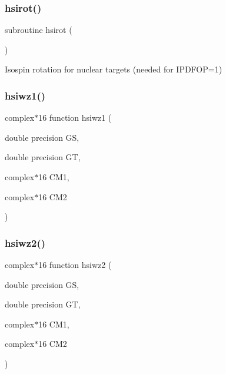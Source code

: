 \subsubsection{\texorpdfstring{hsirot()}{hsirot()}}
{\footnotesize\ttfamily subroutine hsirot (\begin{DoxyParamCaption}{ }\end{DoxyParamCaption})}



Isospin rotation for nuclear targets (needed for I\+P\+D\+F\+OP=1) 

\mbox{\label{djangoh__h_8f_a57c2acc216ca2579ebdaffd3f7250e69}} 
\subsubsection{\texorpdfstring{hsiwz1()}{hsiwz1()}}
{\footnotesize\ttfamily complex$\ast$16 function hsiwz1 (\begin{DoxyParamCaption}\item[{double precision}]{GS,  }\item[{double precision}]{GT,  }\item[{complex$\ast$16}]{C\+M1,  }\item[{complex$\ast$16}]{C\+M2 }\end{DoxyParamCaption})}

\mbox{\label{djangoh__h_8f_ae089808ec513a8d216f6d1be102aa46a}} 
\subsubsection{\texorpdfstring{hsiwz2()}{hsiwz2()}}
{\footnotesize\ttfamily complex$\ast$16 function hsiwz2 (\begin{DoxyParamCaption}\item[{double precision}]{GS,  }\item[{double precision}]{GT,  }\item[{complex$\ast$16}]{C\+M1,  }\item[{complex$\ast$16}]{C\+M2 }\end{DoxyParamCaption})}

\mbox{\label{djangoh__h_8f_a785f3d406148e0a234e6f6514b985e81}} 
